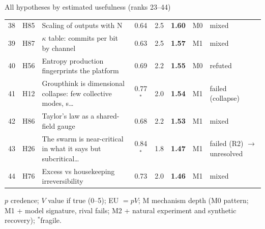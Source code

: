 \begin{frame}{All hypotheses by estimated usefulness (ranks 23--44)}
{\begin{tabular}{@{}rl>{\raggedright\arraybackslash}p{}ccccl@{}}
38 & H85 & Scaling of outputs with N & 0.64 & 2.5 & \textbf{1.60} & M0 & mixed\\
39 & H87 & $\kappa$ table: commits per bit by channel & 0.63 & 2.5 & \textbf{1.57} & M1 & mixed\\
40 & H56 & Entropy production fingerprints the platform & 0.69 & 2.2 & \textbf{1.55} & M0 & refuted\\
41 & H12 & Groupthink is dimensional collapse: few collective modes, s\ldots & 0.77$^\ast$ & 2.0 & \textbf{1.54} & M1 & failed (collapse)\\
42 & H86 & Taylor's law as a shared-field gauge & 0.68 & 2.2 & \textbf{1.53} & M1 & mixed\\
43 & H26 & The swarm is near-critical in what it says but subcritical\ldots & 0.84$^\ast$ & 1.8 & \textbf{1.47} & M1 & failed (R2) $\to$ unresolved\\
44 & H76 & Excess vs housekeeping irreversibility & 0.73 & 2.0 & \textbf{1.46} & M1 & mixed\\
\end{tabular}}\par\vspace{0.2em}
{\tiny\color{muted}$p$ credence; $V$ value if true (0--5); EU $=pV$; M mechanism depth (M0 pattern; M1 + model signature, rival fails; M2 + natural experiment and synthetic recovery); $^\ast$fragile.}
\end{frame}

